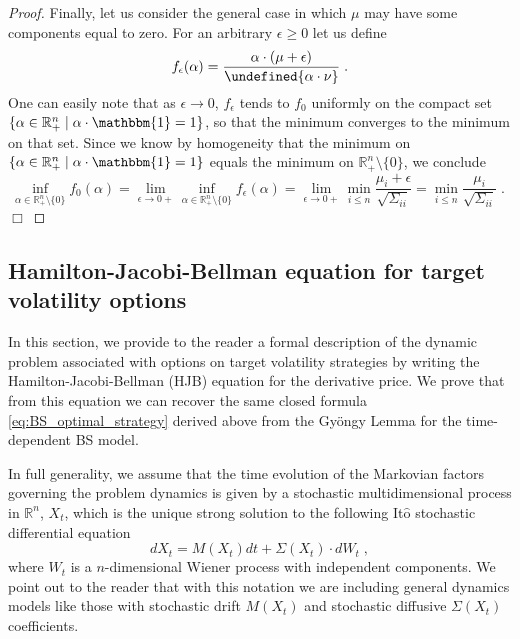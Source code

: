 \documentclass[runningheads]{m2ef}
\let\norm\undefined %
\DeclarePairedDelimiter\norm{\lVert}{\rVert}
\begin{document}
\begin{proof}
		Finally, let us consider the general case in which $\mu$ may have some components equal to zero. For an arbitrary $\epsilon \geq 0$ let us define
		\begin{equation}
		f_{\epsilon}(\alpha) = \frac{\alpha \cdot (\mu+\epsilon)}{\norm{\alpha \cdot \nu}} \; .
		\end{equation}
		One can easily note that as $\epsilon \to 0$, $f_{\epsilon}$ tends to $f_{0}$ uniformly on the compact set $\{\alpha \in \mathbb{R}^n_+ \mid \alpha \cdot \mathbbm{1} = 1\}$, so that the minimum converges to the minimum on that set. Since we know by homogeneity that the minimum on $\{\alpha \in \mathbb{R}^n_+ \mid \alpha \cdot \mathbbm{1} = 1\}$ equals the minimum on $\mathbb{R}^n_+ \setminus \{0\}$, we conclude
		\begin{equation}
		\inf_{\alpha \in \mathbb{R}_{+}^n \setminus \{0\}} f_0(\alpha) = 
		\lim_{\epsilon \to 0+} \inf_{\alpha \in \mathbb{R}_{+}^n \setminus \{0\}} f_{\epsilon}(\alpha) = 
		\lim_{\epsilon \to 0+} \min_{i\leq n} \frac{\mu_i+\epsilon}{\sqrt{\Sigma_{ii}}} =
		\min_{i\leq n} \frac{\mu_i}{\sqrt{\Sigma_{ii}}} \; . \; 
		\end{equation} $\Box$
	\end{proof}


	\subsection{Hamilton-Jacobi-Bellman equation for target volatility options}\label{subsec:HJB}
	In this section, we provide to the reader a formal description of the dynamic problem associated with options on target volatility strategies by writing the Hamilton-Jacobi-Bellman (HJB) equation for the derivative price. We prove that from this equation we can recover the same closed formula \eqref{eq:BS_optimal_strategy} derived above from the Gy\"ongy Lemma for the time-dependent BS model. 

	In full generality, we assume that the time evolution of the Markovian factors governing the problem dynamics is given by  a stochastic multidimensional process in $\mathbb{R}^n$, $X_t$, which is the unique strong solution to the following It$\hat{\text{o}}$ stochastic differential equation 
	\begin{equation}
			dX_t = M(X_t)dt + \Sigma(X_t) \cdot dW_t \; ,
	\end{equation}
	where $W_t$ is a $n$-dimensional Wiener process with independent components. We point out to the reader that with this notation we are including general dynamics models like those with stochastic drift $M(X_t)$ and stochastic diffusive $\Sigma(X_t)$ coefficients. 
\end{document}
